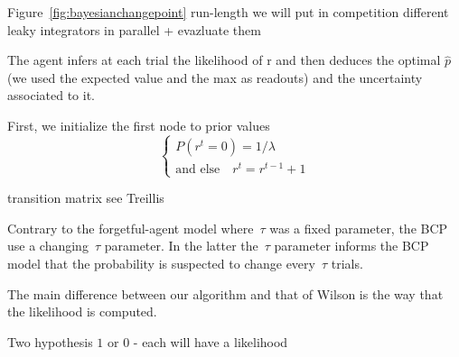 \documentclass[profile,final,english,draft]{article}%
\newcommand{\choice}[1]{ %
	\left\{ %
		\begin{array}{l} #1 \end{array} %
	\right. }
\newcommand{\eql}[1]{\begin{equation}#1\end{equation}}
\newcommand{\seeFig}[1]{Figure~\ref{fig:#1}}
\begin{document}


\seeFig{bayesianchangepoint}
run-length we will put in competition different leaky integrators in parallel + evazluate them 


The agent infers at each trial the likelihood  of r and then deduces the optimal $\hat{p}$ (we used the expected value and the max as readouts) and the uncertainty associated to it. 

First, we initialize the first node to prior values
\eql{\choice{
P(r^t = 0) = 1 / \lambda  \\
\text{and else} \quad r^t = r^{t-1} +1 }\label{eq:run_length}}

transition matrix see Treillis

Contrary to the forgetful-agent model where~$\tau$ was a fixed parameter, the BCP use a changing~$\tau$ parameter. In the latter the~$\tau$ parameter informs the BCP model that the probability is suspected to change every~$\tau$ trials.



The main difference between our algorithm and that of Wilson is the way that the likelihood is computed.


Two hypothesis $1$ or $0$ - each will have a likelihood


\end{document}
